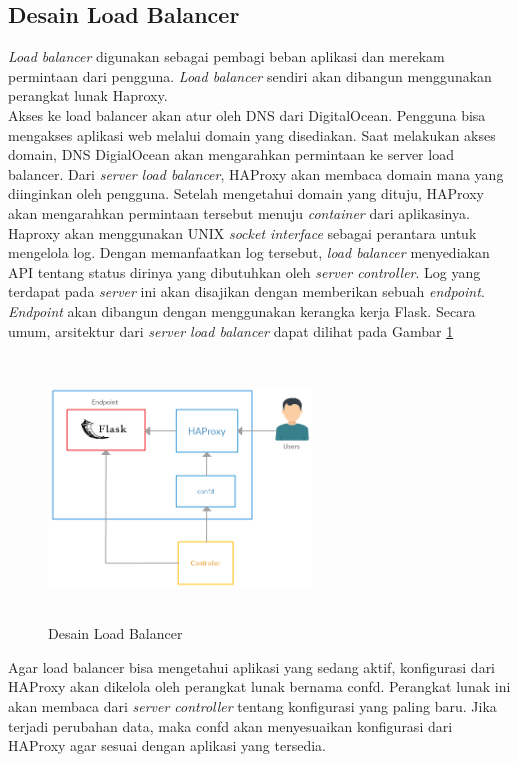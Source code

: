 		\subsection{Desain Load Balancer}
            	\textit{Load balancer} digunakan sebagai pembagi beban aplikasi dan merekam permintaan dari pengguna. \textit{Load balancer} sendiri akan dibangun menggunakan perangkat lunak Haproxy.\\
                \indent Akses ke load balancer akan atur oleh DNS dari DigitalOcean. Pengguna bisa mengakses aplikasi web melalui domain yang disediakan. Saat melakukan akses domain, DNS DigialOcean akan mengarahkan permintaan ke server load balancer. Dari \textit{server load balancer}, HAProxy akan membaca domain mana yang diinginkan oleh pengguna. Setelah mengetahui domain yang dituju, HAProxy akan mengarahkan permintaan tersebut menuju \textit{container} dari aplikasinya. \\
            	\indent Haproxy akan menggunakan UNIX \textit{socket interface} sebagai perantara untuk mengelola log. Dengan memanfaatkan log tersebut, \textit{load balancer} menyediakan API tentang status dirinya yang dibutuhkan oleh \textit{server controller}. Log yang terdapat pada \textit{server} ini akan disajikan dengan memberikan sebuah \textit{endpoint}. \textit{Endpoint} akan dibangun dengan menggunakan kerangka kerja Flask. Secara umum, arsitektur dari \textit{server load balancer} dapat dilihat pada Gambar \ref{desain:loadbalancer}\\
                \begin{figure}[H]
                    \centering
                    \includegraphics[width=7cm,height=7cm]{Images/C-3/loadbalancer.png}
                    \caption{Desain Load Balancer}
                    \label{desain:loadbalancer}
				\end{figure}
            	\indent Agar load balancer bisa mengetahui aplikasi yang sedang aktif, konfigurasi dari HAProxy akan dikelola oleh perangkat lunak bernama confd. Perangkat lunak ini akan membaca dari \textit{server controller} tentang konfigurasi yang paling baru. Jika terjadi perubahan data, maka confd akan menyesuaikan konfigurasi dari HAProxy agar sesuai dengan aplikasi yang tersedia. \\
            

